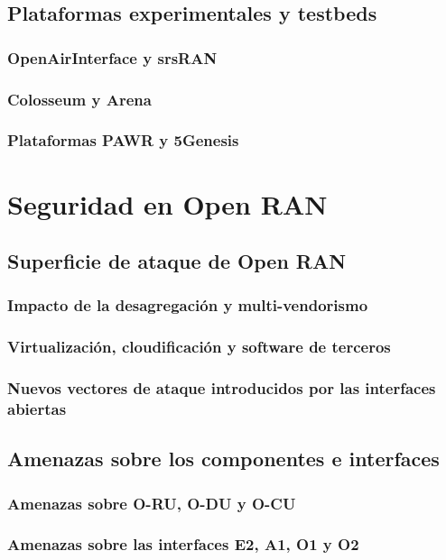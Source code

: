 \documentclass[11pt,a4paper]{article}
\makeatletter
\let\ORIGsection\section
\def\section{\@nobreakfalse\ORIGsection}
\let\ORIGsubsection\subsection
\def\subsection{\@nobreakfalse\ORIGsubsection}
\let\ORIGsubsubsection\subsubsection
\def\subsubsection{\@nobreakfalse\ORIGsubsubsection}
\makeatother
\begin{document}
\subsection{Plataformas experimentales y testbeds}

\subsubsection{OpenAirInterface y srsRAN}
\subsubsection{Colosseum y Arena}
\subsubsection{Plataformas PAWR y 5Genesis}


\section{Seguridad en Open RAN}

\subsection{Superficie de ataque de Open RAN}

\subsubsection{Impacto de la desagregación y multi-vendorismo}
\subsubsection{Virtualización, cloudificación y software de terceros}
\subsubsection{Nuevos vectores de ataque introducidos por las interfaces abiertas}

\subsection{Amenazas sobre los componentes e interfaces}

\subsubsection{Amenazas sobre O-RU, O-DU y O-CU}
\subsubsection{Amenazas sobre las interfaces E2, A1, O1 y O2}
\end{document}
